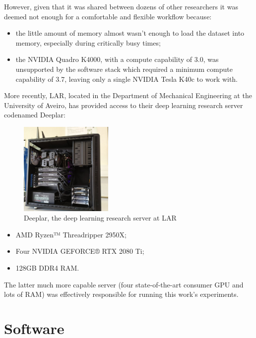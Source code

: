 However, given that it was shared between dozens of other researchers it was deemed not enough for a comfortable and flexible workflow because:

\begin{itemize}
    \item the little amount of memory almost wasn't enough to load the dataset into memory, especially during critically busy times;
    \item the NVIDIA Quadro K4000, with a compute capability of 3.0, was unsupported by the software stack which required a minimum compute capability of 3.7, leaving only a single NVIDIA Tesla K40c to work with.
\end{itemize}

More recently, \ac{LAR}, located in the Department of Mechanical Engineering at the University of Aveiro, has provided access to their deep learning research server codenamed Deeplar:

\begin{figure}[ht]
    \centering
    \includegraphics[width=0.4\textwidth]{figs/deeplar.jpg}
    \caption{Deeplar, the deep learning research server at \ac{LAR}}
    \label{fig:deeplar}
\end{figure}

\begin{itemize}
    \item AMD Ryzen™ Threadripper 2950X;
    \item Four NVIDIA GEFORCE® RTX 2080 Ti;
    \item 128GB DDR4 RAM.
\end{itemize}

The latter much more capable server (four state-of-the-art consumer \ac{GPU} and lots of \ac{RAM}) was effectively responsible for running this work's experiments.

\section{Software}

